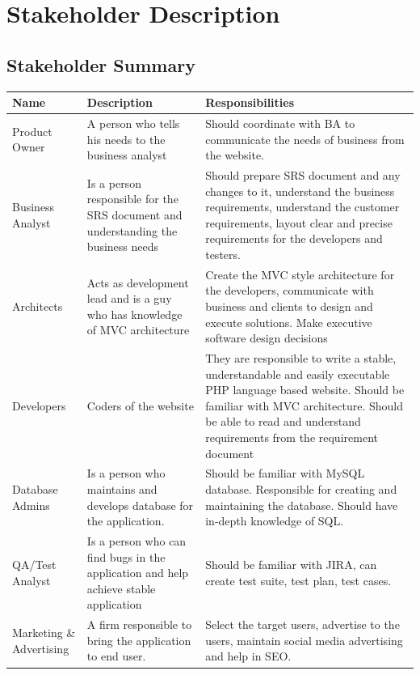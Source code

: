 \documentclass{article}
\begin{document}
\section{Stakeholder Description}

\subsection{Stakeholder Summary}


\begin{longtable}{|p{4.5cm}|p{4.5cm}|p{6.5cm}|}
\hline
\textbf{Name} & \textbf{Description} & \textbf{Responsibilities} \\ \hline
Product Owner & A person who tells his needs to the business analyst & Should coordinate with BA to communicate the needs of business from the website.\\ \hline
Business Analyst & Is a person responsible for the SRS document and understanding the business needs & Should prepare SRS document and any changes to it, understand the business requirements, understand the customer requirements, layout clear and precise requirements for the developers and testers.\\ \hline
Architects & Acts as development lead and is a guy who has knowledge of MVC architecture  & Create the MVC style architecture for the developers, communicate with business and clients to design and execute solutions. Make executive software design decisions\\ \hline
Developers & Coders of the website & They are responsible to write a stable, understandable and easily executable PHP language based website. Should be familiar with MVC architecture. Should be able to read and understand requirements from the requirement document\\ \hline
Database Admins & Is a person who maintains and develops database for the application. & Should be familiar with MySQL database. Responsible for creating and maintaining the database. Should have in-depth knowledge of SQL.\\ \hline
QA/Test Analyst & Is a person who can find bugs in the application and help achieve stable application & Should be familiar with JIRA, can create test suite, test plan, test cases.\\ \hline
Marketing \& Advertising & A firm responsible to bring the application to end user. & Select the target users, advertise to the users, maintain social media advertising and help in SEO. \\ \hline
\end{longtable}
\end{document}
